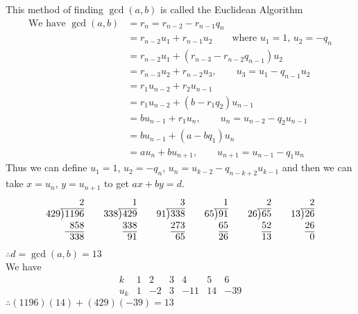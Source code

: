 This method of finding $\gcd(a,b)$ is called the Euclidean Algorithm
\begin{align*}
\text{We have } \gcd(a,b) &= r_n = r_{n-2} - r_{n-1}q_n \\
&= r_{n-2}u_1 + r_{n-1}u_2 \qquad\text{where $u_1=1$, $u_2=-q_n$} \\
&= r_{n-2}u_1 + (r_{n-3}-r_{n-2}q_{n-1})u_2 \\
&= r_{n-3}u_2 + r_{n-2}u_3, \qquad u_3=u_1-q_{n-1}u_2 \\
&= r_1u_{n-2} + r_2u_{n-1} \\
&= r_1u_{n-2} + (b-r_1q_2)u_{n-1} \\
&= bu_{n-1} + r_1u_n, \qquad u_n=u_{n-2}-q_2u_{n-1} \\
&= bu_{n-1} + (a-bq_1)u_n \\
&= au_n + bu_{n+1}, \qquad u_{n+1}=u_{n-1}-q_1u_n
\end{align*}
Thus we can define $u_1=1$, $u_2=-q_n$, $u_n=u_{k-2}-q_{n-k+2}u_{k-1}$ and then we can take $x=u_n$, $y=u_{n+1}$ to get $ax+by=d$.
\[
\begin{array}{@{}r@{}r@{}r@{}}
&& 2 \\ \cline{2-3}
429 & \big) & 1196 \\
& & 858 \\ \cline{3-3}
&& 338
\end{array}\qquad
\begin{array}{@{}r@{}r@{}r@{}}
&& 1 \\ \cline{2-3}
338 & \big) & 429 \\
& & 338 \\ \cline{3-3}
&& 91
\end{array}\qquad
\begin{array}{@{}r@{}r@{}r@{}}
&& 3 \\ \cline{2-3}
91 & \big) & 338 \\
& & 273 \\ \cline{3-3}
&& 65
\end{array}\qquad
\begin{array}{@{}r@{}r@{}r@{}}
&& 1 \\ \cline{2-3}
65 & \big) & 91 \\
& & 65 \\ \cline{3-3}
&& 26
\end{array}\qquad
\begin{array}{@{}r@{}r@{}r@{}}
&& 2 \\ \cline{2-3}
26 & \big) & 65 \\
& & 52 \\ \cline{3-3}
&& 13
\end{array}\qquad
\begin{array}{@{}r@{}r@{}r@{}}
&& 2 \\ \cline{2-3}
13 & \big) & 26 \\
& & 26 \\ \cline{3-3}
&& 0
\end{array}
\]
$\therefore d=\gcd(a,b)=13$ \\
We have
\[ \begin{array}{c|cccccc}
k & 1 & 2 & 3 & 4 & 5 & 6 \\ \hline
u_k & 1 & -2 & 3 & -11 & 14 & -39
\end{array} \]
$\therefore (1196)(14)+(429)(-39)=13$

